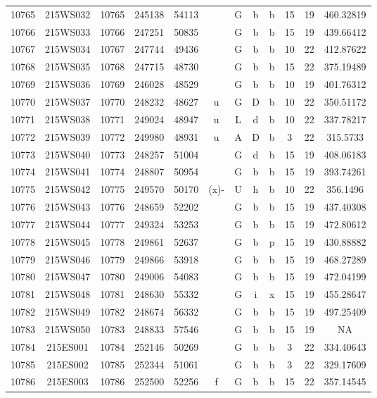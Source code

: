 \begin{tabular}{|*{12}{c|}}
10765 & 215WS032 & 10765 & 245138 & 54113 &  & G & b & b & 15 & 19 & 460.32819 \\ 
10766 & 215WS033 & 10766 & 247251 & 50835 &  & G & b & b & 15 & 19 & 439.66412 \\ 
10767 & 215WS034 & 10767 & 247744 & 49436 &  & G & b & b & 10 & 22 & 412.87622 \\ 
10768 & 215WS035 & 10768 & 247715 & 48730 &  & G & b & b & 15 & 22 & 375.19489 \\ 
10769 & 215WS036 & 10769 & 246028 & 48529 &  & G & b & b & 10 & 19 & 401.76312 \\ 
10770 & 215WS037 & 10770 & 248232 & 48627 & u & G & D & b & 10 & 22 & 350.51172 \\ 
10771 & 215WS038 & 10771 & 249024 & 48947 & u & L & d & b & 10 & 22 & 337.78217 \\ 
10772 & 215WS039 & 10772 & 249980 & 48931 & u & A & D & b & 3 & 22 & 315.5733 \\ 
10773 & 215WS040 & 10773 & 248257 & 51004 &  & G & d & b & 15 & 19 & 408.06183 \\ 
10774 & 215WS041 & 10774 & 248807 & 50954 &  & G & b & b & 15 & 19 & 393.74261 \\ 
10775 & 215WS042 & 10775 & 249570 & 50170 & (x)- & U & h & b & 10 & 22 & 356.1496 \\ 
10776 & 215WS043 & 10776 & 248659 & 52202 &  & G & b & b & 15 & 19 & 437.40308 \\ 
10777 & 215WS044 & 10777 & 249324 & 53253 &  & G & b & b & 15 & 19 & 472.80612 \\ 
10778 & 215WS045 & 10778 & 249861 & 52637 &  & G & b & p & 15 & 19 & 430.88882 \\ 
10779 & 215WS046 & 10779 & 249866 & 53918 &  & G & b & b & 15 & 19 & 468.27289 \\ 
10780 & 215WS047 & 10780 & 249006 & 54083 &  & G & b & b & 15 & 19 & 472.04199 \\ 
10781 & 215WS048 & 10781 & 248630 & 55332 &  & G & i & x & 15 & 19 & 455.28647 \\ 
10782 & 215WS049 & 10782 & 248674 & 56332 &  & G & b & b & 15 & 19 & 497.25409 \\ 
10783 & 215WS050 & 10783 & 248833 & 57546 &  & G & b & b & 15 & 19 & NA \\ 
10784 & 215ES001 & 10784 & 252146 & 50269 &  & G & b & b & 3 & 22 & 334.40643 \\ 
10785 & 215ES002 & 10785 & 252344 & 51061 &  & G & b & b & 3 & 22 & 329.17609 \\ 
10786 & 215ES003 & 10786 & 252500 & 52256 & f & G & b & b & 15 & 22 & 357.14545 \\ 

\end{tabular}
